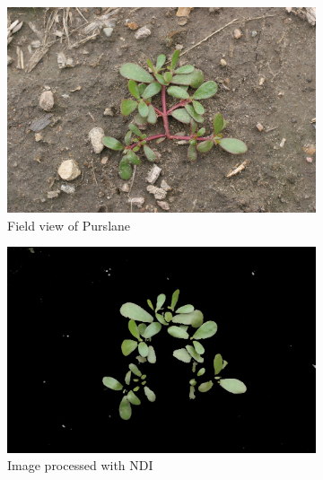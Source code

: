 \documentclass[letterpaper]{article}
\begin{document}
{\begin{figure}[h]
	\centering
	\begin{subfigure}[t]{.30\textwidth}
	  \centering
	  \includegraphics[width=1\linewidth]{figures/purslane.png}
	  \caption{Field view of Purslane}
	  \label{fig:original}
	\end{subfigure}
	\begin{subfigure}[t]{.30\textwidth}
	  \centering
	  \includegraphics[width=1\linewidth]{figures/ndi-purslane.jpg}
	  \caption{Image processed with NDI}
	  \label{fig:ndi}
	\end{subfigure}
	\begin{subfigure}[t]{.30\textwidth}

\end{subfigure}
\end{figure}}
\end{document}
